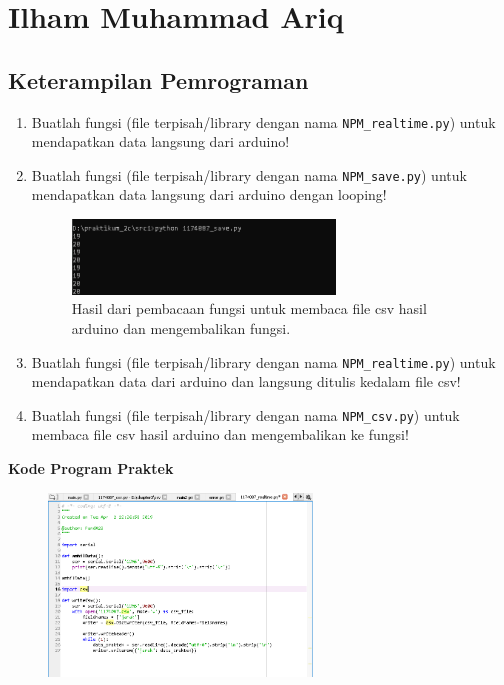 \section{Ilham Muhammad Ariq}
\subsection{Keterampilan Pemrograman}
\begin{enumerate}
	\item Buatlah  fungsi  (file  terpisah/library  dengan  nama  \verb|NPM_realtime.py|)  untuk mendapatkan data langsung dari arduino!

	
	
	\item Buatlah fungsi (file terpisah/library dengan nama \verb|NPM_save.py|) untuk mendapatkan data langsung dari arduino dengan looping!
	
	

\begin{figure}[ht]
	\includegraphics[width=7cm]{figures/5/1174087/Praktek/1174087_save.png}
	\centering
	\caption{Hasil dari pembacaan fungsi untuk membaca file csv hasil arduino dan mengembalikan fungsi.}
\end{figure}

	\item Buatlah  fungsi  (file  terpisah/library  dengan  nama  \verb|NPM_realtime.py|) untuk mendapatkan data dari arduino dan langsung ditulis kedalam file csv!
	
	

	\item Buatlah fungsi (file terpisah/library dengan nama \verb|NPM_csv.py|) untuk membaca file csv hasil arduino dan mengembalikan ke fungsi!
	
	

\end{enumerate}

\textbf{Kode Program Praktek}
\begin{figure}[ht]
	\includegraphics[width=7cm]{figures/5/1174087/Praktek/1174087_realtime.png}
	\centering
\end{figure}

